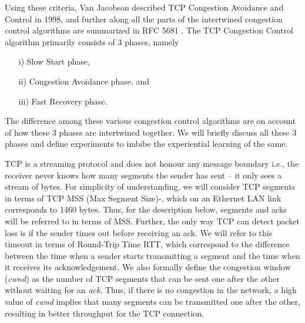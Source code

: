 \begin{multicols}{2}
Using these criteria, Van Jacobson described TCP Congestion Avoidance and Control \cite{art2-key04} in 1998, and further along all the parts of the intertwined congestion control algorithms are summarized in RFC 5681  \cite{art2-key05}.  The TCP Congestion Control algorithm primarily consists of 3 phases, namely
\begin{itemize}
\item[i)] Slow Start phase,

\item[ii)] Congestion Avoidance phase, and

\item[iii)] Fast Recovery phase. 
\end{itemize}

The difference among these various congestion control algorithms are on account of how these 3 phases are intertwined together. We will briefly discuss all these 3 phases and define experiments to imbibe the experiential learning of the same.

TCP is a streaming protocol \cite{art2-key13} and does not honour any message boundary i.e., the receiver never knows how many segments the sender has sent – it only sees a stream of bytes. For simplicity of understanding, we will consider TCP segments in terms of TCP MSS (Max Segment Size)-\cite{art2-key06}\cite{art2-key07}, which on an Ethernet LAN link corresponds to 1460 bytes. Thus, for the description below, segments and acks will be referred to in terms of MSS. Further, the only way TCP can detect packet loss is if the sender times out before receiving an ack. We will refer to this timeout in terms of Round-Trip Time RTT, which correspond to the difference between the time when a sender starts transmitting a segment and the time when it receives its acknowledgement. We also formally define the congestion window (\textit{cwnd}) as the number of TCP segments that can be sent one after the other without waiting for an \textit{ack}. Thus, if there is no congestion in the network, a high value of \textit{cwnd} implies that many segments can be transmitted one after the other, resulting in better throughput for the TCP connection.


\end{multicols}
